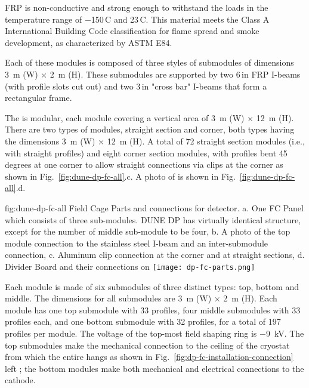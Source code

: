 FRP is non-conductive and strong enough to withstand the \fc loads in the temperature range of \num{-150}\,C and \num{23}\,C.
This material meets the  Class A International Building Code classification for flame spread and smoke development, 
as characterized by ASTM E84. 


Each of these modules is composed of three 
styles of submodules of dimensions \SI{3}{\m} (W) $\times$ \SI{2}{\m} (H). These submodules are supported by two \num{6}\,in FRP I-beams (with profile slots cut out) and two \num{3}\,in "cross bar" I-beams that form a rectangular frame.  


The \fc is modular, each module covering a vertical area of \SI{3}{\m} (W) $\times$ \SI{12}{\m} (H). 
There are two types of modules, straight section and corner, both types having the dimensions \SI{3}{\m} (W) $\times$ \SI{12}{\m} (H). A total of 72 straight section modules (i.e., with straight profiles) and eight corner section modules, with profiles bent \num{45} degrees at one corner to allow straight connections via clips at the corner as shown in Fig.~\ref{fig:dune-dp-fc-all}.c.  A photo of  \fc is shown in Fig.~\ref{fig:dune-dp-fc-all}.d.

\begin{dunefigure}[DP FC Parts]{fig:dune-dp-fc-all}
{Field Cage Parts and connections for  detector.  a. One  FC Panel which consists of three sub-modules.  DUNE DP has virtually identical structure, except for the number of middle sub-module to be four, b. A photo of the top module connection to the stainless steel I-beam and an inter-submodule connection, c. Aluminum clip connection at the corner and at straight sections, d.  Divider Board and their connections on  \fc }
\texttt{[image: dp-fc-parts.png]}
\end{dunefigure}


Each \fc module is made of six submodules of three distinct types: top, bottom and middle. The dimensions for all submodules are \SI{3}{\m} (W) $\times$ \SI{2}{\m} (H).
Each module has one top submodule with 33 profiles, four middle submodules with 33 profiles each, and one bottom submodule with 32 profiles, for a total of 197 profiles per module. The voltage of the top-most field shaping ring  is \SI{-9}{\kV}. 
The top submodules make the mechanical connection to the ceiling of the cryostat from which the entire \fc hangs as shown in Fig.~\ref{fig:dp-fc-installation-connection} left ; the bottom modules make both mechanical and electrical connections to the cathode. 


